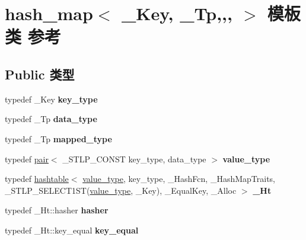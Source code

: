 \hypertarget{classhash__map}{}\section{hash\+\_\+map$<$ \+\_\+\+Key, \+\_\+\+Tp,,, $>$ 模板类 参考}
\label{classhash__map}
\subsection*{Public 类型}
\begin{DoxyCompactItemize}
\item 
\mbox{\label{classhash__map_a0f5fe4afdabdc0a7a34d35c0973ac87b}} 
typedef \+\_\+\+Key {\bfseries key\+\_\+type}
\item 
\mbox{\label{classhash__map_a4da2cf8e7c5538dc9ae197be6584748d}} 
typedef \+\_\+\+Tp {\bfseries data\+\_\+type}
\item 
\mbox{\label{classhash__map_a3cef74e91b83e0f041285365a7dc6986}} 
typedef \+\_\+\+Tp {\bfseries mapped\+\_\+type}
\item 
\mbox{\label{classhash__map_a3956ac4ec2fa5a728984e3c3306a9d82}} 
typedef \hyperlink{structpair}{pair}$<$ \+\_\+\+S\+T\+L\+P\+\_\+\+C\+O\+N\+ST key\+\_\+type, data\+\_\+type $>$ {\bfseries value\+\_\+type}
\item 
\mbox{\label{classhash__map_a75dbff4d44bffc5a65c10469803159d5}} 
typedef \hyperlink{classhashtable}{hashtable}$<$ \hyperlink{structpair}{value\+\_\+type}, key\+\_\+type, \+\_\+\+Hash\+Fcn, \+\_\+\+Hash\+Map\+Traits, \+\_\+\+S\+T\+L\+P\+\_\+\+S\+E\+L\+E\+C\+T1\+ST(\hyperlink{structpair}{value\+\_\+type}, \+\_\+\+Key), \+\_\+\+Equal\+Key, \+\_\+\+Alloc $>$ {\bfseries \+\_\+\+Ht}
\item 
\mbox{\label{classhash__map_aaa5d328a4e66de8707555289a7147b6f}} 
typedef \+\_\+\+Ht\+::hasher {\bfseries hasher}
\item 
\mbox{\label{classhash__map_acda22e336c8c9365e0d65f3b4bbd8854}} 
typedef \+\_\+\+Ht\+::key\+\_\+equal {\bfseries key\+\_\+equal}
\item 

\end{DoxyCompactItemize}
